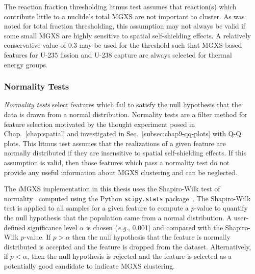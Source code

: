 The reaction fraction thresholding litmus test assumes that reaction(s) which contribute little to a nuclide's total \ac{MGXS} are not important to cluster. As was noted for total fraction thresholding, this assumption may not always be valid if some small \ac{MGXS} are highly sensitive to spatial self-shielding effects. A relatively conservative value of 0.3 may be used for the threshold such that \ac{MGXS}-based features for U-235 fission and U-238 capture are always selected for thermal energy groups.


\subsubsection{Normality Tests}
\label{subsubsec:chap10-litmus-normality}

\textit{Normality tests} select features which fail to satisfy the null hypothesis that the data is drawn from a normal distribution. Normality tests are a filter method for feature selection motivated by the thought experiment posed in Chap.~\ref{chap:spatial} and investigated in Sec.~\ref{subsec:chap9-qq-plots} with \ac{Q-Q} plots. This litmus test assumes that the realizations of a given feature are normally distributed if they are insensitive to spatial self-shielding effects. If this assumption is valid, then those features which pass a normality test do not provide any useful information about \ac{MGXS} clustering and can be neglected.

The \textit{i}\ac{MGXS} implementation in this thesis uses the Shapiro-Wilk test of normality~\cite{shapiro1965analysis} computed using the Python \texttt{scipy.stats} package~\cite{jones2011scipy}. The Shapiro-Wilk test is applied to all samples for a given feature to compute a $p$-value to quantify the null hypothesis that the population came from a normal distribution. A user-defined significance level $\alpha$ is chosen (\textit{e.g.}, 0.001) and compared with the Shapiro-Wilk $p$-value. If $p > \alpha$ then the null hypothesis that the feature is normally distributed is accepted and the feature is dropped from the dataset. Alternatively, if $p < \alpha$, then the null hypothesis is rejected and the feature is selected as a potentially good candidate to indicate \ac{MGXS} clustering.

